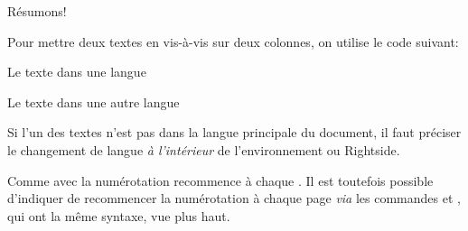 {Résumons!

Pour mettre deux textes en vis-à-vis sur deux colonnes, on utilise le code suivant: 

\begin{latexcode}

\begin{pages}  %
\begin{Leftside} %
 \beginnumbering %
 \pstart %
 
Le texte dans une langue 
 
 \pend
 \endnumbering  %
 \end{Leftside} %
 
 \begin{Rightside}  %
 \beginnumbering
 \pstart
 
 Le texte dans une autre langue
 
 \pend
 \endnumbering
 \end{Rightside} 
 \Pages

  \end{pages} %
\end{latexcode}

\begin{attention}
Si l'un des textes n'est pas dans la langue principale du document, il faut préciser le changement de langue \emph{à l'intérieur} de l'environnement  ou {Rightside}.

\begin{latexcode}
\begin{Leftside}
\begin{<langue>}
\end{<langue>}
\end{Leftside}
\end{latexcode}
\end{attention}

\begin{attention}
Comme avec  la numérotation recommence à chaque . Il est toutefois possible d'indiquer de recommencer la numérotation  à chaque page \emph{via} les commandes  et , qui ont la même syntaxe, vue plus haut. 
\end{attention}

}
